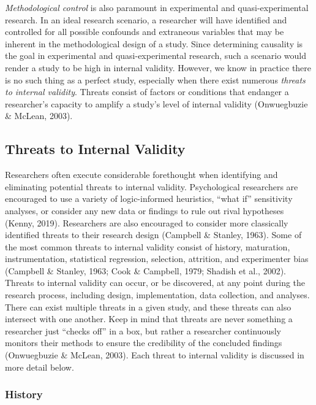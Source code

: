 \documentclass[
  11pt,
]{book}
\begin{document}
\emph{Methodological control} is also paramount in experimental and quasi-experimental research. In an ideal research scenario, a researcher will have identified and controlled for all possible confounds and extraneous variables that may be inherent in the methodological design of a study. Since determining causality is the goal in experimental and quasi-experimental research, such a scenario would render a study to be high in internal validity. However, we know in practice there is no such thing as a perfect study, especially when there exist numerous \emph{threats to internal validity}. Threats consist of factors or conditions that endanger a researcher's capacity to amplify a study's level of internal validity (Onwuegbuzie \& McLean, 2003).

\subsection{Threats to Internal Validity}\label{threats-to-internal-validity}

Researchers often execute considerable forethought when identifying and eliminating potential threats to internal validity. Psychological researchers are encouraged to use a variety of logic-informed heuristics, ``what if'' sensitivity analyses, or consider any new data or findings to rule out rival hypotheses (Kenny, 2019). Researchers are also encouraged to consider more classically identified threats to their research design (Campbell \& Stanley, 1963). Some of the most common threats to internal validity consist of history, maturation, instrumentation, statistical regression, selection, attrition, and experimenter bias (Campbell \& Stanley, 1963; Cook \& Campbell, 1979; Shadish et al., 2002). Threats to internal validity can occur, or be discovered, at any point during the research process, including design, implementation, data collection, and analyses. There can exist multiple threats in a given study, and these threats can also intersect with one another. Keep in mind that threats are never something a researcher just ``checks off'' in a box, but rather a researcher continuously monitors their methods to ensure the credibility of the concluded findings (Onwuegbuzie \& McLean, 2003). Each threat to internal validity is discussed in more detail below.

\subsubsection{History}\label{history}
\end{document}
